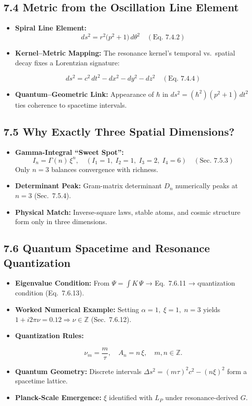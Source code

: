 \subsection{7.4 Metric from the Oscillation Line Element}
\begin{itemize}
  \item \textbf{Spiral Line Element:}  
    \[
      ds^2 = r^2\bigl(p^2+1\bigr)\,d\theta^2
      \quad(\text{Eq.~7.4.2})
    \]
  \item \textbf{Kernel–Metric Mapping:} The resonance kernel’s temporal vs.\ spatial decay fixes a Lorentzian signature:
    \begin{framed}
      \[
        ds^2 = c^2\,dt^2 - dx^2 - dy^2 - dz^2
        \quad(\text{Eq.~7.4.4})
      \]
    \end{framed}
  \item \textbf{Quantum–Geometric Link:} Appearance of \(\hbar\) in \(ds^2=(\hbar^2)(p^2+1)\,dt^2\) ties coherence to spacetime intervals.
\end{itemize}

\subsection{7.5 Why Exactly Three Spatial Dimensions?}
\begin{itemize}
  \item \textbf{Gamma-Integral “Sweet Spot”:}  
    \[
      I_n = \Gamma(n)\,\xi^n,\quad
      (I_1=1,\;I_2=1,\;I_3=2,\;I_4=6)
      \quad(\text{Sec.~7.5.3})
    \]
    Only \(n=3\) balances convergence with richness.
  \item \textbf{Determinant Peak:} Gram-matrix determinant \(D_n\) numerically peaks at \(n=3\) (Sec.~7.5.4).
  \item \textbf{Physical Match:} Inverse-square laws, stable atoms, and cosmic structure form only in three dimensions.
\end{itemize}

\subsection{7.6 Quantum Spacetime and Resonance Quantization}
\begin{itemize}
  \item \textbf{Eigenvalue Condition:} From \(\Psi = \int K\,\Psi\) → Eq.~7.6.11 → quantization condition (Eq.~7.6.13).
  \item \textbf{Worked Numerical Example:}  
    Setting \(\alpha=1,\;\xi=1,\;n=3\) yields \(1 + i2\pi\nu = 0.12 \Rightarrow \nu\in\mathbb{Z}\) (Sec.~7.6.12).
  \item \textbf{Quantization Rules:}  
    \begin{framed}
      \[
        \nu_m = \frac{m}{\tau},\quad
        A_n = n\,\xi,\quad
        m,n\in\mathbb{Z}.
      \]
    \end{framed}
  \item \textbf{Quantum Geometry:}  
    Discrete intervals \(\Delta s^2=(m\tau)^2c^2-(n\xi)^2\) form a spacetime lattice.
  \item \textbf{Planck-Scale Emergence:} \(\xi\) identified with \(L_P\) under resonance-derived \(G\).
\end{itemize}

